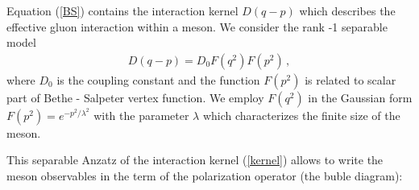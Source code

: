 \documentclass[%
]{ittmm}
\begin{document}
Equation (\ref{BS}) contains the interaction kernel $D(q-p)$ 
which describes the effective gluon interaction within a meson. 
We consider the rank -1 separable  model 
\begin{eqnarray}\label{kernel}
  D(q-p) = D_0 F(q^2) F(p^2) \, ,
\end{eqnarray}
where $D_0$ is the coupling constant and the function 
$F(p^2)$ is related to scalar part of Bethe - Salpeter  vertex
function. We employ  $F(q^2)$  in the Gaussian form 
$F(p^2)= e^{-p^2/\lambda^2}$ with the parameter $\lambda$ which  characterizes the finite size of the meson. 

This separable Anzatz of the interaction kernel (\ref{kernel}) allows to write the meson observables in the term of the polarization operator (the buble diagram): 


\end{document}
